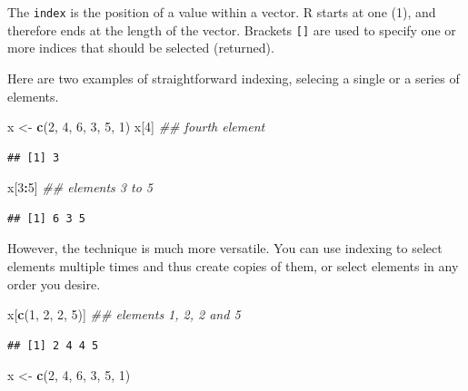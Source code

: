 \documentclass[]{book}
\newenvironment{Shaded}{\begin{snugshade}}{\end{snugshade}}
\newcommand{\CommentTok}[1]{\textcolor[rgb]{0.56,0.35,0.01}{\textit{#1}}}
\newcommand{\DecValTok}[1]{\textcolor[rgb]{0.00,0.00,0.81}{#1}}
\newcommand{\KeywordTok}[1]{\textcolor[rgb]{0.13,0.29,0.53}{\textbf{#1}}}
\newcommand{\NormalTok}[1]{#1}
\newcommand{\OperatorTok}[1]{\textcolor[rgb]{0.81,0.36,0.00}{\textbf{#1}}}
\newcommand{\StringTok}[1]{\textcolor[rgb]{0.31,0.60,0.02}{#1}}
\begin{document}
The \texttt{index} is the position of a value within a vector. R starts at one (1), and therefore ends at the length of the vector. Brackets \texttt{{[}{]}} are used to specify one or more indices that should be selected (returned).

Here are two examples of straightforward indexing, selecing a single or a series of elements.

\begin{Shaded}
\begin{Highlighting}[]
\NormalTok{x <-}\StringTok{ }\KeywordTok{c}\NormalTok{(}\DecValTok{2}\NormalTok{, }\DecValTok{4}\NormalTok{, }\DecValTok{6}\NormalTok{, }\DecValTok{3}\NormalTok{, }\DecValTok{5}\NormalTok{, }\DecValTok{1}\NormalTok{)}
\NormalTok{x[}\DecValTok{4}\NormalTok{] }\CommentTok{## fourth element}
\end{Highlighting}
\end{Shaded}

\begin{verbatim}
## [1] 3
\end{verbatim}

\begin{Shaded}
\begin{Highlighting}[]
\NormalTok{x[}\DecValTok{3}\OperatorTok{:}\DecValTok{5}\NormalTok{] }\CommentTok{## elements 3 to 5}
\end{Highlighting}
\end{Shaded}

\begin{verbatim}
## [1] 6 3 5
\end{verbatim}

However, the technique is much more versatile. You can use indexing to select elements multiple times and thus create copies of them, or select elements in any order you desire.

\begin{Shaded}
\begin{Highlighting}[]
\NormalTok{x[}\KeywordTok{c}\NormalTok{(}\DecValTok{1}\NormalTok{, }\DecValTok{2}\NormalTok{, }\DecValTok{2}\NormalTok{, }\DecValTok{5}\NormalTok{)] }\CommentTok{## elements 1, 2, 2 and 5}
\end{Highlighting}
\end{Shaded}

\begin{verbatim}
## [1] 2 4 4 5
\end{verbatim}

\begin{Shaded}
\begin{Highlighting}[]
\NormalTok{x <-}\StringTok{ }\KeywordTok{c}\NormalTok{(}\DecValTok{2}\NormalTok{, }\DecValTok{4}\NormalTok{, }\DecValTok{6}\NormalTok{, }\DecValTok{3}\NormalTok{, }\DecValTok{5}\NormalTok{, }\DecValTok{1}\NormalTok{)}
\end{Highlighting}
\end{Shaded}
\end{document}
